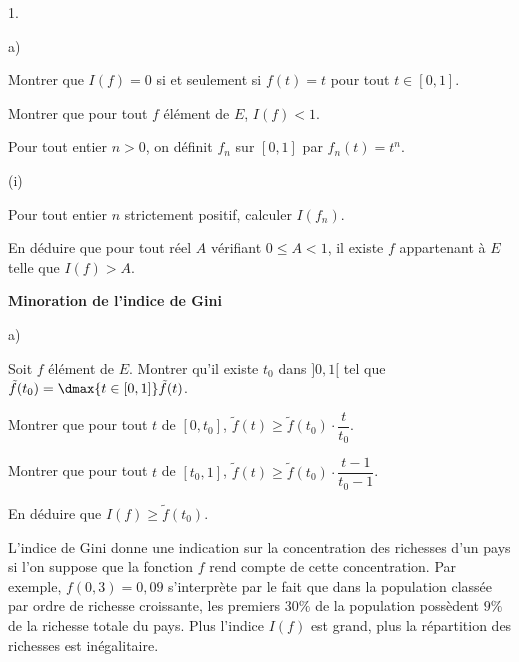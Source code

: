 \documentclass[11pt]{article}%
\begin{document}
\begin{noliste}{1.}
\begin{noliste}{a)}
  

  
  \item Montrer que $I(f) =0$ si et seulement si $f(t)=t$ pour tout $t 
  \in [0,1]$. 
  
  
  
  
  
  

  
  \item Montrer que pour tout $f$ élément de $E$, $I(f) < 1$.
  
  

  
  \item Pour tout entier $n >0$, on définit $f_n$ sur $[0,1]$ par 
  $f_n(t)=t^n$.
  \begin{nonoliste}{(i)}
    \item Pour tout entier $n$ strictement positif, calculer $I(f_n)$.
    
    

    
    \item En déduire que pour tout réel $A$ vérifiant $0 \leq A <1$, il 
    existe $f$ appartenant à $E$ telle que $I(f)>A$. 
    
    

  \end{nonoliste}
 \end{noliste}
 
 \item \textbf{Minoration de l'indice de Gini} 
 \begin{noliste}{a)}
  \item Soit $f$ élément de $E$. Montrer qu'il existe $t_0$ dans 
  $]0,1[$ tel que $\tilde{f}(t_0)= \dmax{t \in [0,1]} \tilde{f}(t)$. 
  
  

 
  \item Montrer que pour tout $t$ de $[0,t_0]$, $\tilde{f}(t) \geq 
  \tilde{f}(t_0) \cdot \dfrac{t}{t_0}$. 
  
  

  
  \item Montrer que pour tout $t$ de $[t_0,1]$, $\tilde{f}(t) \geq 
  \tilde{f}(t_0) \cdot \dfrac{t-1}{t_0-1}$. 
  
  
  
  \item En déduire que $I(f) \geq \tilde{f}(t_0)$. 
  
  

 \end{noliste}
 L'indice de Gini donne une indication sur la concentration des 
 richesses d'un pays si l'on suppose que la fonction $f$ rend compte de 
 cette concentration. Par exemple, $f(0,3)=0,09$ s'interprète par le 
 fait que dans la population classée par ordre de richesse croissante, 
 les premiers $30 \%$ de la population possèdent $9\%$ de la richesse 
 totale du pays. Plus l'indice $I(f)$ est grand, plus la répartition 
 des richesses est inégalitaire.
\end{noliste}
\end{document}
